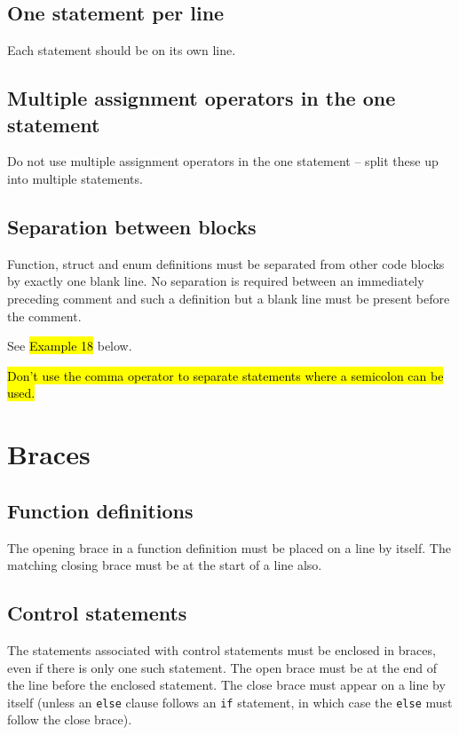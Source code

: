 \documentclass{article}
\begin{document}
\subsection{One statement per line}

Each statement should be on its own line.
\nolinenumbers
{}

\linenumbers

\subsection{Multiple assignment operators in the one statement}

Do not use multiple assignment operators in the one statement -- split these up into multiple statements.

\nolinenumbers
{}

\linenumbers

\subsection{Separation between blocks}
Function, struct and enum definitions must be separated from other code blocks by exactly one blank line. No separation is
required between an immediately preceding comment and such a definition but a blank line must be present before the comment.

See \hl{Example 18} below.

\hl{Don't use the comma operator to separate statements where a semicolon can be used.}

\section{Braces}

\subsection{Function definitions}
The opening brace in a function definition must be placed on a line by itself. The matching closing brace must be at
the start of a line also.
\nolinenumbers
{}

\linenumbers

\subsection{Control statements}
The statements associated with control statements must be enclosed in braces, even if there is only one such statement. The open brace must be at the end of the line before the enclosed statement. The close brace must appear on a line by itself (unless an \texttt{else} clause follows an \texttt{if} statement, in which case the \texttt{else} must follow the close brace).
\nolinenumbers
{}

\linenumbers
\end{document}
